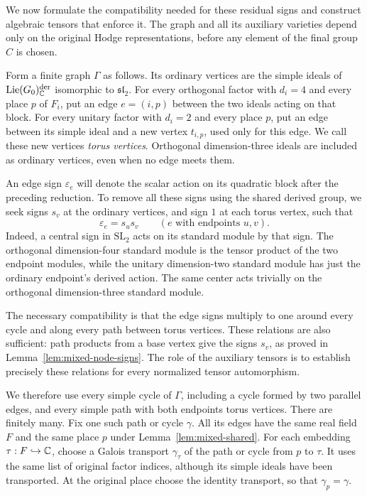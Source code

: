 We now formulate the compatibility needed for these residual signs and
construct algebraic tensors that enforce it.  The graph and all its
auxiliary varieties depend only on the original Hodge representations,
before any element of the final group $C$ is chosen.

Form a finite graph $\Gamma$ as follows.  Its ordinary vertices are
the simple ideals of $\operatorname{Lie}(G_0)^{\rm der}_{\mathbb C}$
isomorphic to $\mathfrak{sl}_2$.  For every orthogonal factor with
$d_i=4$ and every place $p$ of $F_i$, put an edge $e=(i,p)$ between
the two ideals acting on that block.  For every unitary factor with
$d_i=2$ and every place $p$, put an edge between its simple ideal and
a new vertex $t_{i,p}$, used only for this edge.  We call these new
vertices \emph{torus vertices}.  Orthogonal dimension-three ideals
are included as ordinary vertices, even when no edge meets them.

An edge sign $\varepsilon_e$ will denote the scalar action on its
quadratic block after the preceding reduction.  To remove all these
signs using the shared derived group, we seek signs $s_v$ at the ordinary
vertices, and sign $1$ at each torus vertex, such that
\begin{equation}\label{eq:mixed-sign-target}
 \varepsilon_e=s_us_v
 \qquad(e\text{ with endpoints }u,v).
\end{equation}
Indeed, a central sign in $\mathrm{SL}_2$ acts on its standard module
by that sign.  The orthogonal dimension-four standard module is the
tensor product of the two endpoint modules, while the unitary
dimension-two standard module has just the ordinary endpoint's derived
action.  The same center acts trivially on the orthogonal
dimension-three standard module.

The necessary compatibility is that the edge signs multiply to one
around every cycle and along every path between torus vertices.
These relations are also sufficient: path products from a base vertex
give the signs $s_v$, as proved in Lemma~\ref{lem:mixed-node-signs}.
The role of the auxiliary tensors is to establish precisely these
relations for every normalized tensor automorphism.

We therefore use every simple cycle of $\Gamma$,
including a cycle formed by two parallel edges, and every simple path
with both endpoints torus vertices.  There are finitely many.  Fix one
such path or cycle $\gamma$.  All its edges have the same real field $F$ and
the same place $p$ under Lemma~\ref{lem:mixed-shared}.  For each
embedding $\tau:F\hookrightarrow\mathbb C$, choose a Galois transport
$\gamma_\tau$ of the path or cycle from $p$ to $\tau$.  It uses the
same list of original factor indices, although its simple ideals have
been transported.  At the original place choose the identity transport,
so that $\gamma_p=\gamma$.

